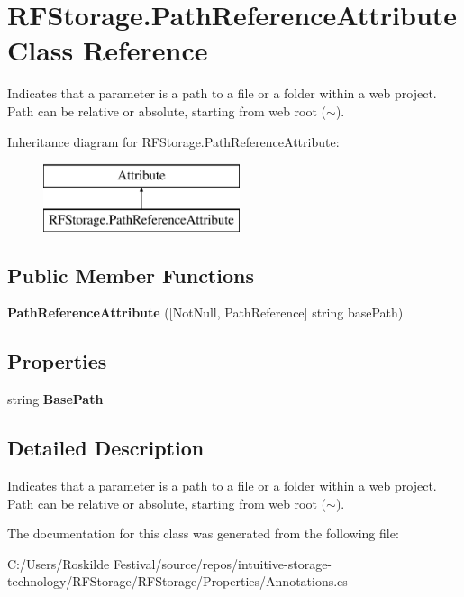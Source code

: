 \section{R\+F\+Storage.\+Path\+Reference\+Attribute Class Reference}
\label{class_r_f_storage_1_1_path_reference_attribute}


Indicates that a parameter is a path to a file or a folder within a web project. Path can be relative or absolute, starting from web root ($\sim$).  


Inheritance diagram for R\+F\+Storage.\+Path\+Reference\+Attribute\+:\begin{figure}[H]
\begin{center}
\leavevmode
\includegraphics[height=2.000000cm]{class_r_f_storage_1_1_path_reference_attribute}
\end{center}
\end{figure}
\subsection*{Public Member Functions}
\begin{DoxyCompactItemize}
\item 
\mbox{\label{class_r_f_storage_1_1_path_reference_attribute_a0dad8573e22d5c87a9ca6a275db0a65f}} 
{\bfseries Path\+Reference\+Attribute} ([Not\+Null, Path\+Reference] string base\+Path)
\end{DoxyCompactItemize}
\subsection*{Properties}
\begin{DoxyCompactItemize}
\item 
\mbox{\label{class_r_f_storage_1_1_path_reference_attribute_a3acded3c6f5486d3cabd009ae62f6f3a}} 
string {\bfseries Base\+Path}\hspace{0.3cm}{\ttfamily  [get]}
\end{DoxyCompactItemize}


\subsection{Detailed Description}
Indicates that a parameter is a path to a file or a folder within a web project. Path can be relative or absolute, starting from web root ($\sim$). 



The documentation for this class was generated from the following file\+:\begin{DoxyCompactItemize}
\item 
C\+:/\+Users/\+Roskilde Festival/source/repos/intuitive-\/storage-\/technology/\+R\+F\+Storage/\+R\+F\+Storage/\+Properties/Annotations.\+cs\end{DoxyCompactItemize}
